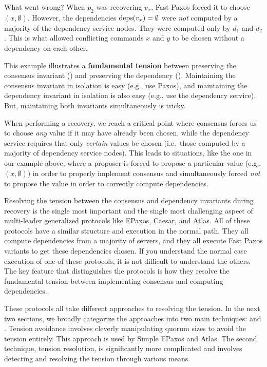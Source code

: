 What went wrong? When $p_2$ was recovering $v_x$, Fast Paxos forced it to
choose $(x, \emptyset{})$. However, the dependencies $\text{deps}(v_x) = \emptyset{}$
were \emph{not} computed by a majority of the dependency service nodes. They
were computed only by $d_1$ and $d_2$. This is what allowed conflicting
commands $x$ and $y$ to be chosen without a dependency on each other.

This example illustrates a \textbf{fundamental tension} between preserving the
consensus invariant () and preserving the dependency
(). Maintaining the consensus invariant in isolation
is easy (e.g., use Paxos), and maintaining the dependency invariant in
isolation is also easy (e.g., use the dependency service). But, maintaining
both invariants simultaneously is tricky.

When performing a recovery, we reach a critical point where consensus forces us
to choose \emph{any} value if it may have already been chosen, while the
dependency service requires that only \emph{certain} values be chosen (i.e.\
those computed by a majority of dependency service nodes).
%
This leads to situations, like the one in our example above, where a proposer
is forced to propose a particular value (e.g., $(x, \emptyset{})$) in order to
properly implement consensus and simultaneously forced \emph{not} to propose
the value in order to correctly compute dependencies.

Resolving the tension between the consensus and dependency invariants during
recovery is the single most important and the single most challenging aspect of
multi-leader generalized protocols like EPaxos, Caesar, and Atlas. All of these
protocols have a similar structure and execution in the normal path. They all
compute dependencies from a majority of servers, and they all execute Fast
Paxos variants to get these dependencies chosen. If you understand the normal
case execution of one of these protocols, it is not difficult to understand the
others. The key feature that distinguishes the protocols is how they resolve
the fundamental tension between implementing consensus and computing
dependencies.

These protocols all take different approaches to resolving the tension. In the
next two sections, we broadly categorize the approaches into two main
techniques: \defword{tension avoidance} and .
Tension avoidance involves cleverly manipulating quorum sizes to avoid the
tension entirely. This approach is used by Simple EPaxos and Atlas. The second
technique, tension resolution, is significantly more complicated and involves
detecting and resolving the tension through various means.

